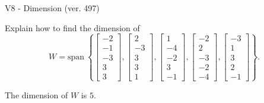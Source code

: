 \begin{exercise}
  \begin{exerciseTitle}V8 - Dimension (ver. 497)\end{exerciseTitle}
  \begin{exerciseStatement}
    Explain how to find the dimension of 
\[W=\mathrm{span}\ \left\{\left[\begin{array}{r}
-2 \\
-1 \\
-3 \\
3 \\
3
\end{array}\right] , \left[\begin{array}{r}
2 \\
-3 \\
3 \\
3 \\
1
\end{array}\right] , \left[\begin{array}{r}
1 \\
-4 \\
-2 \\
3 \\
-1
\end{array}\right] , \left[\begin{array}{r}
-2 \\
2 \\
-3 \\
-2 \\
-4
\end{array}\right] , \left[\begin{array}{r}
-3 \\
1 \\
3 \\
2 \\
-1
\end{array}\right]\right\}.\]



  \end{exerciseStatement}
  \begin{exerciseAnswer}
   The dimension of \(W\) is  \(5\).
  


  \end{exerciseAnswer}
\end{exercise}